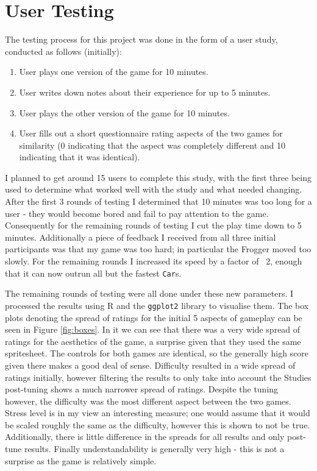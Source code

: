 \documentclass[12pt, a4paper]{report}
\begin{document}
\section{User Testing}

The testing process for this project was done in the form of a user study, conducted as follows (initially):
\begin{enumerate}
  \item User plays one version of the game for 10 minutes.
  \item User writes down notes about their experience for up to 5 minutes.
  \item User plays the other version of the game for 10 minutes.
  \item User fills out a short questionnaire rating aspects of the two games for similarity (0 indicating that the aspect was completely different and 10 indicating that it was identical).
\end{enumerate}

I planned to get around 15 users to complete this study, with the first three being used to determine what worked well with the study and what needed changing.
After the first 3 rounds of testing I determined that 10 minutes was too long for a user - they would become bored and fail to pay attention to the game.
Consequently for the remaining rounds of testing I cut the play time down to 5 minutes.
Additionally a piece of feedback I received from all three initial participants was that my game was too hard; in particular the Frogger moved too slowly.
For the remaining rounds I increased its speed by a factor of ~2, enough that it can now outrun all but the fastest \verb|Car|s.

\par

The remaining rounds of testing were all done under these new parameters.
I processed the results using R and the \verb|ggplot2| library to visualise them.
The box plots denoting the spread of ratings for the initial 5 aspects of gameplay can be seen in Figure \ref{fig:boxes}.
In it we can see that there was a very wide spread of ratings for the aesthetics of the game, a surprise given that they used the same spritesheet.
The controls for both games are identical, so the generally high score given there makes a good deal of sense.
Difficulty resulted in a wide spread of ratings initially, however filtering the results to only take into account the Studies post-tuning shows a much narrower spread of ratings.
Despite the tuning however, the difficulty was the most different aspect between the two games.
Stress level is in my view an interesting measure; one would assume that it would be scaled roughly the same as the difficulty, however this is shown to not be true.
Additionally, there is little difference in the spreads for all results and only post-tune results.
Finally understandability is generally very high - this is not a surprise as the game is relatively simple.
\end{document}
